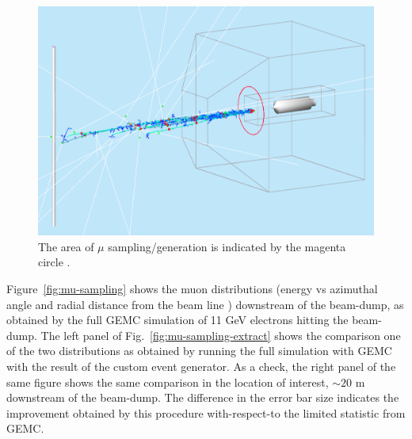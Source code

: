 \begin{figure}[h!] 
\center
\includegraphics[width=12cm]{figs/mu-gen.pdf}   
\caption{The area  of $\mu$ sampling/generation is indicated by the magenta circle .}
\label{fig:mu-gen}
\end{figure}


Figure~\ref{fig:mu-sampling} shows the muon distributions (energy vs azimuthal angle and radial distance from the beam line ) downstream of the beam-dump, as obtained by the full GEMC simulation of  11 GeV electrons hitting the beam-dump.
The left panel of Fig.~\ref{fig:mu-sampling-extract} shows the comparison one of the two distributions as obtained by running the full simulation with GEMC with the result of the custom event generator. 
As a check, the right panel of the same figure  shows the same comparison in the location of interest, $\sim 20$ m downstream of the beam-dump.
The difference in the error bar size indicates the improvement obtained by this procedure with-respect-to  the limited statistic from GEMC. 

